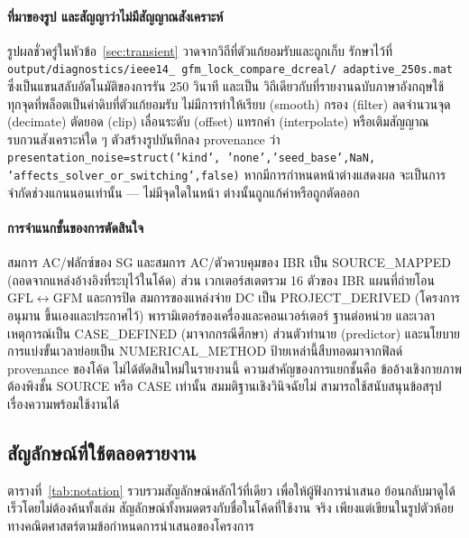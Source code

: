 \documentclass[12pt,a4paper]{article}
\begin{document}
\paragraph{ที่มาของรูป และสัญญาว่าไม่มีสัญญาณสังเคราะห์}
\begin{sloppypar}
รูปผลชั่วครู่ในหัวข้อ~\ref{sec:transient} วาดจากวิถีที่ตัวแก้ยอมรับและถูกเก็บ
รักษาไว้ที่ \texttt{output/\allowbreak diagnostics/\allowbreak ieee14\_\allowbreak
gfm\_\allowbreak lock\_\allowbreak compare\_\allowbreak dcreal/\allowbreak
adaptive\_\allowbreak 250s.mat} ซึ่งเป็นแขนสลับอัตโนมัติของการรัน 250 วินาที และเป็น
วิถีเดียวกับที่รายงานฉบับภาษาอังกฤษใช้ ทุกจุดที่พล็อตเป็นค่าดิบที่ตัวแก้ยอมรับ
ไม่มีการทำให้เรียบ
(smooth) กรอง (filter) ลดจำนวนจุด (decimate) ตัดยอด (clip) เลื่อนระดับ (offset)
แทรกค่า (interpolate) หรือเติมสัญญาณรบกวนสังเคราะห์ใด ๆ ตัวสร้างรูปบันทึกลง
provenance ว่า \texttt{presentation\_\allowbreak noise=struct('kind',\allowbreak
'none',\allowbreak 'seed\_\allowbreak base',NaN,\allowbreak
'affects\_\allowbreak solver\_\allowbreak or\_\allowbreak switching',false)}
หากมีการกำหนดหน้าต่างแสดงผล จะเป็นการจำกัดช่วงแกนนอนเท่านั้น --- ไม่มีจุดใดในหน้า
ต่างนั้นถูกแก้ค่าหรือถูกตัดออก
\end{sloppypar}

\paragraph{การจำแนกชั้นของการตัดสินใจ}
\begin{sloppypar}
สมการ AC/ฟลักซ์ของ SG และสมการ AC/ตัวควบคุมของ IBR เป็น
\textsf{SOURCE\_\allowbreak MAPPED} (ถอดจากแหล่งอ้างอิงที่ระบุไว้ในโค้ด) ส่วน
เวกเตอร์สเตตรวม 16 ตัวของ IBR แผนที่ถ่ายโอน GFL$\leftrightarrow$GFM และการปิด
สมการของแหล่งจ่าย DC เป็น \textsf{PROJECT\_\allowbreak DERIVED} (โครงการอนุมาน
ขึ้นเองและประกาศไว้) พารามิเตอร์ของเครื่องและคอนเวอร์เตอร์ ฐานต่อหน่วย และเวลา
เหตุการณ์เป็น \textsf{CASE\_\allowbreak DEFINED} (มาจากกรณีศึกษา) ส่วนตัวทำนาย
(predictor) และนโยบายการแบ่งขั้นเวลาย่อยเป็น
\textsf{NUMERICAL\_\allowbreak METHOD} ป้ายเหล่านี้สืบทอดมาจากฟิลด์ provenance
ของโค้ด ไม่ได้ตัดสินใหม่ในรายงานนี้ ความสำคัญของการแยกชั้นคือ ข้ออ้างเชิงกายภาพ
ต้องพิงชั้น \textsf{SOURCE} หรือ \textsf{CASE} เท่านั้น สมมติฐานเชิงวินิจฉัยไม่
สามารถใช้สนับสนุนข้อสรุปเรื่องความพร้อมใช้งานได้
\end{sloppypar}
\newpage
\subsection{สัญลักษณ์ที่ใช้ตลอดรายงาน}\label{sec:notation}
ตารางที่~\ref{tab:notation} รวบรวมสัญลักษณ์หลักไว้ที่เดียว เพื่อให้ผู้ฟังการนำเสนอ
ย้อนกลับมาดูได้เร็วโดยไม่ต้องค้นทั้งเล่ม สัญลักษณ์ทั้งหมดตรงกับชื่อในโค้ดที่ใช้งาน
จริง เพียงแต่เขียนในรูปตัวห้อยทางคณิตศาสตร์ตามข้อกำหนดการนำเสนอของโครงการ
\end{document}
